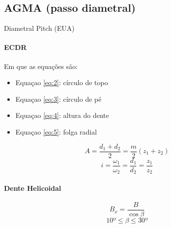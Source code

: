 \subsection{AGMA (passo diametral)}
Diametral Pitch (EUA)

\paragraph{ECDR}


Em que as equações são:
\begin{itemize}
\item Equaçao \ref{eq:2}: círculo de topo
\item Equaçao \ref{eq:3}: círculo de pé
\item Equaçao \ref{eq:4}: altura do dente
\item Equaçao \ref{eq:5}: folga radial
\end{itemize}



\[A = \frac{d_{1}+d_{2}}{2}=\frac{m}{2}(z_{1}+z_{2})\]
\[i = \frac{\omega _{1}}{\omega _{2}} = \frac{d _{1}}{d_{2}}=\frac{z_{1}}{z_{2}}\]

\paragraph{Dente Helicoidal}

\[B_{x}=\frac{B}{\cos \beta}\]
\[10º \leqslant \beta \leqslant 30º\]




